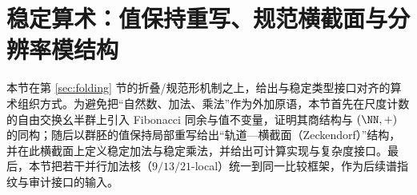 \section{稳定算术：值保持重写、规范横截面与分辨率模结构}\label{sec:emergent-arithmetic}

本节在第 \ref{sec:folding} 节的折叠/规范形机制之上，给出与稳定类型接口对齐的算术组织方式。为避免把“自然数、加法、乘法”作为外加原语，本节首先在尺度计数的自由交换幺半群上引入 Fibonacci 同余与值不变量，证明其商结构与 \((\NN,+)\) 的同构；随后以群胚的值保持局部重写给出“轨道—横截面（Zeckendorf）”结构，并在此横截面上定义稳定加法与稳定乘法，并给出可计算实现与复杂度接口。最后，本节把若干并行加法核（\(9/13/21\)-local）统一到同一比较框架，作为后续谱指纹与审计接口的输入。














